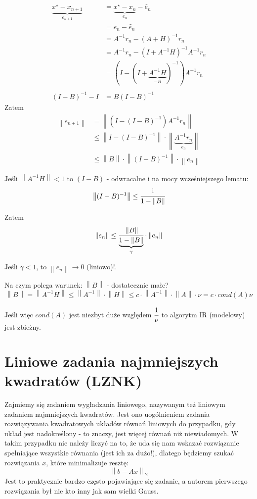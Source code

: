 \documentclass[hidelinks,a4paper,fleqn,oneside]{book}
\newcommand{\ra}{\rightarrow}
\newcommand{\norm}[1]{\left\lVert#1\right\rVert}
\begin{document}
\begin{align*}
	\underbrace{x^\star - x_{n+1}}_{e_{n+1}} & = \underbrace{x^\star - x_n}_{e_n} - \tilde{e_n} \\
	& = e_n - \tilde{e_n} \\
	& = A^{-1}r_n  - (A+H)^{-1}r_n \\
	& = A^{-1}r_n - (I + A^{-1}H)^{-1}A^{-1}r_n \\
	& = (I - (I + \underbrace{A^{-1}H}_{-B})^{-1})A^{-1}r_n \\ \\
	(I - B)^{-1} - I & = B(I - B)^{-1}
\end{align*}
Zatem
\begin{align*}
	\norm{e_{n+1}} & = \norm{(I - (I - B)^{-1})A^{-1} r_n} \\
	& \leq \norm{I - (I - B)^{-1}} \cdot \norm{\underbrace{A^{-1} r_n}_{e_n}} \\
	& \leq \norm{B} \cdot \norm{(I - B)^{-1}} \cdot \norm{e_n}
\end{align*}

Jeśli $\norm{A^{-1}H} < 1$ to $(I - B)$ - odwracalne i na mocy wcześniejszego lematu:
\[
	\norm{(I - B)^{-1}} \leq \cfrac{1}{1 - \norm{B}}
\]

Zatem
\[
	\norm{e_n} \leq \cfrac{\norm{B}}{\underbrace{1 - \norm{B}}_{\gamma}} \cdot \norm{e_n}
\]

Jeśli $\gamma < 1$, to $\norm{e_n} \ra 0$ (liniowo)!.

Na czym polega warunek: $\norm{B}$ - dostatecznie małe?
\[
	\norm{B} = \norm{A^{-1} H} \leq \norm{A^{-1}} \cdot \norm{H} \leq c \cdot \norm{A^{-1}} \cdot \norm{A} \cdot \nu = c \cdot cond(A) \nu
\]

Jeśli więc $cond(A)$ jest niezbyt duże względem $\cfrac{1}{\nu}$ to algorytm IR (modelowy) jest zbieżny.

\section{Liniowe zadania najmniejszych kwadratów (LZNK)} 
Zajmiemy się zadaniem wygładzania liniowego, nazywanym też liniowym zadaniem najmniejszych kwadratów. Jest ono uogólnieniem zadania rozwiązywania kwadratowych układów równań liniowych do przypadku, gdy układ jest nadokreślony - to znaczy, jest więcej równań niż niewiadomych. W takim przypadku nie należy liczyć na to, że uda się nam wskazać rozwiązanie spełniające wszystkie równania (jest ich za dużo!), dlatego będziemy szukać rozwiązania $x$, które minimalizuje resztę:
\[\norm{b-Ax}_2\]
Jest to praktycznie bardzo często pojawiające się zadanie, a autorem pierwszego rozwiązania był nie kto inny jak sam wielki Gauss.
\end{document}
